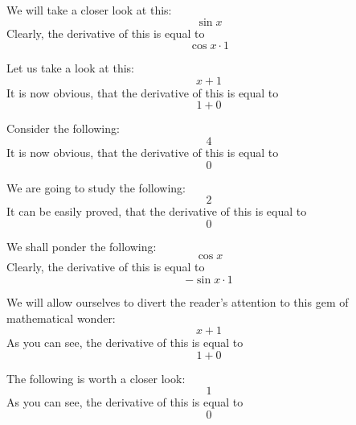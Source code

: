 \documentclass{article}
\begin{document}
We will take a closer look at this:
\begin{equation}
\sin x 
\end{equation}
Clearly, the derivative of this is equal to
\begin{equation}
\cos x \cdot 1 
\end{equation}

Let us take a look at this:
\begin{equation}
x + 1 
\end{equation}
It is now obvious, that the derivative of this is equal to
\begin{equation}
1 + 0 
\end{equation}

Consider the following:
\begin{equation}
4 
\end{equation}
It is now obvious, that the derivative of this is equal to
\begin{equation}
0 
\end{equation}

We are going to study the following:
\begin{equation}
2 
\end{equation}
It can be easily proved, that the derivative of this is equal to
\begin{equation}
0 
\end{equation}

We shall ponder the following:
\begin{equation}
\cos x 
\end{equation}
Clearly, the derivative of this is equal to
\begin{equation}
-\sin x \cdot 1 
\end{equation}

We will allow ourselves to divert the reader's attention to this gem of mathematical wonder:
\begin{equation}
x + 1 
\end{equation}
As you can see, the derivative of this is equal to
\begin{equation}
1 + 0 
\end{equation}

The following is worth a closer look:
\begin{equation}
1 
\end{equation}
As you can see, the derivative of this is equal to
\begin{equation}
0 
\end{equation}
\end{document}
